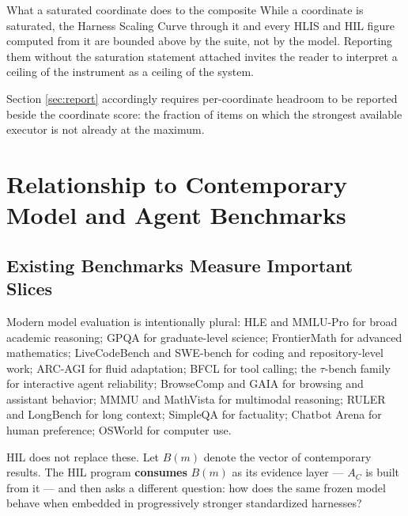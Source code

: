 \documentclass[11pt]{article}
\theoremstyle{definition}
\begin{document}
\begin{cautionbox}{What a saturated coordinate does to the composite}
While a coordinate is saturated, the Harness Scaling Curve through it and every HLIS and HIL figure computed from it are bounded above by the suite, not by the model. Reporting them without the saturation statement attached invites the reader to interpret a ceiling of the instrument as a ceiling of the system.

Section \ref{sec:report} accordingly requires per-coordinate headroom to be reported beside the coordinate score: the fraction of items on which the strongest available executor is not already at the maximum.
\end{cautionbox}

\section{Relationship to Contemporary Model and Agent Benchmarks}

\subsection{Existing Benchmarks Measure Important Slices}

Modern model evaluation is intentionally plural: HLE \citep{phan2025hle} and MMLU-Pro \citep{wang2024mmlupro} for broad academic reasoning; GPQA \citep{rein2023gpqa} for graduate-level science; FrontierMath \citep{glazer2024frontiermath} for advanced mathematics; LiveCodeBench \citep{jain2024livecodebench} and SWE-bench \citep{jimenez2023swebench} for coding and repository-level work; ARC-AGI \citep{arc2026} for fluid adaptation; BFCL \citep{patil2025bfcl} for tool calling; the $\tau$-bench family \citep{yao2024taubench} for interactive agent reliability; BrowseComp \citep{wei2025browsecomp} and GAIA \citep{mialon2023gaia} for browsing and assistant behavior; MMMU \citep{yue2023mmmu} and MathVista \citep{lu2023mathvista} for multimodal reasoning; RULER \citep{hsieh2024ruler} and LongBench \citep{bai2024longbench} for long context; SimpleQA \citep{openai2024simpleqa} for factuality; Chatbot Arena \citep{chiang2024arena} for human preference; OSWorld \citep{xie2024osworld} for computer use.

HIL does not replace these. Let $B(m)$ denote the vector of contemporary results. The HIL program \textbf{consumes} $B(m)$ as its evidence layer --- $A_C$ is built from it --- and then asks a different question: how does the same frozen model behave when embedded in progressively stronger standardized harnesses?
\end{document}
